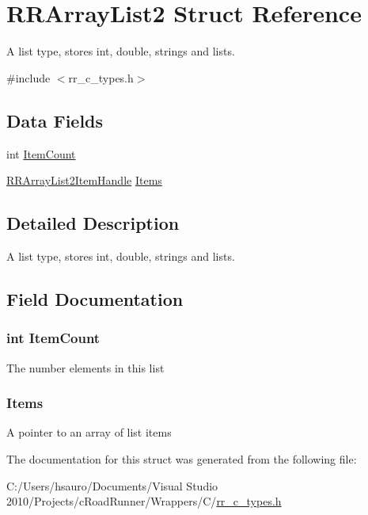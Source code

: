 \hypertarget{struct_r_r_array_list2}{
\section{\-R\-R\-Array\-List2 \-Struct \-Reference}
\label{struct_r_r_array_list2}
}


\-A list type, stores int, double, strings and lists.  




{\ttfamily \#include $<$rr\-\_\-c\-\_\-types.\-h$>$}

\subsection*{\-Data \-Fields}
\begin{DoxyCompactItemize}
\item 
int \hyperlink{struct_r_r_array_list2_ab970c710c7f3897df3c63f76dc5a0793}{\-Item\-Count}
\item 
\hyperlink{rr__c__types_8h_a98a79f5d723f2b60fd6db9c3c6dfa20a}{\-R\-R\-Array\-List2\-Item\-Handle} \hyperlink{struct_r_r_array_list2_aff798cb8027dcb29fd09e5396f8428fe}{\-Items}
\end{DoxyCompactItemize}


\subsection{\-Detailed \-Description}
\-A list type, stores int, double, strings and lists. 

\subsection{\-Field \-Documentation}
\hypertarget{struct_r_r_array_list2_ab970c710c7f3897df3c63f76dc5a0793}{
\subsubsection[{\-Item\-Count}]{\setlength{\rightskip}{0pt plus 5cm}int {\bf \-Item\-Count}}}
\label{struct_r_r_array_list2_ab970c710c7f3897df3c63f76dc5a0793}
\-The number elements in this list \hypertarget{struct_r_r_array_list2_aff798cb8027dcb29fd09e5396f8428fe}{
\subsubsection[{\-Items}]{ {\bf \-Items}}}
\label{struct_r_r_array_list2_aff798cb8027dcb29fd09e5396f8428fe}
\-A pointer to an array of list items 

\-The documentation for this struct was generated from the following file\-:\begin{DoxyCompactItemize}
\item 
\-C\-:/\-Users/hsauro/\-Documents/\-Visual Studio 2010/\-Projects/c\-Road\-Runner/\-Wrappers/\-C/\hyperlink{rr__c__types_8h}{rr\-\_\-c\-\_\-types.\-h}\end{DoxyCompactItemize}
